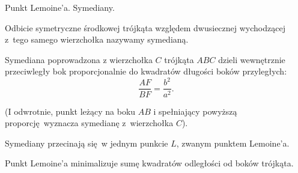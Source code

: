 Punkt Lemoine'a.
Symediany.

\begin{definition}[symediana]
    Odbicie symetryczne środkowej trójkąta względem dwusiecznej wychodzącej z~tego samego wierzchołka nazywamy symedianą.
\end{definition}

\begin{proposition}
    Symediana poprowadzona z wierzchołka $C$ trójkąta $ABC$ dzieli wewnętrznie przeciwległy bok proporcjonalnie do kwadratów długości boków przyległych:
    \begin{equation}
        \frac{AF}{BF} = \frac{b^2}{a^2}.
    \end{equation}
\end{proposition}

(I odwrotnie, punkt leżący na boku $AB$ i spełniający powyższą proporcję wyznacza symedianę z~wierzchołka $C$).

\begin{proposition}
    \label{punkt_lemoine}%
    Symediany przecinają się w jednym punkcie $L$, zwanym punktem Lemoine'a.
\end{proposition}

\begin{proposition}
    Punkt Lemoine'a minimalizuje sumę kwadratów odległości od boków trójkąta.
\end{proposition}

